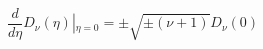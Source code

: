 \begin{equation}
\frac{d}{d\eta }D_{\nu }(\eta )\left| _{\eta =0}\right. =\pm \sqrt{\pm
\left( \nu +1\right) }D_{\nu }\left( 0\right)  \label{eq24}
\end{equation}

